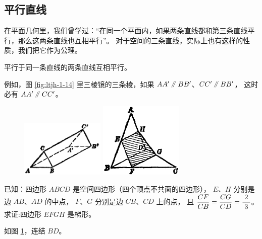\subsection{平行直线}\label{subsec:1-5}
\begin{enhancedline}

在平面几何里，我们曾学过：“在同一个平面内，如果两条直线都和第三条直线平行，那么这两条直线也互相平行”。
对于空间的三条直线，实际上也有这样的性质，我们把它作为公理。

\begin{gongli}[公理4][gl:zxpx]
    平行于同一条直线的两条直线互相平行。
\end{gongli}

例如，图 \ref{fig:ltjh-1-14} 里三棱镜的三条棱，如果 $AA' \pingxing BB'$、$CC' \pingxing BB'$，
这时必有 $AA' \pingxing CC'$。

\begin{figure}[htbp]
    \centering
    \begin{minipage}[b]{7cm}
        \centering
        \includegraphics[width=4cm]{../pic/ltjh-ch1-14.png}
        \caption{}\label{fig:ltjh-1-14}
    \end{minipage}
    \qquad
    \begin{minipage}[b]{7cm}
        \centering
        \includegraphics[width=4cm]{../pic/ltjh-ch1-15.png}
        \caption{}\label{fig:ltjh-1-15}
    \end{minipage}
\end{figure}

\liti[0] 已知：四边形 $ABCD$ 是空间四边形（四个顶点不共面的四边形），
$E$、$H$ 分别是边 $AB$、$AD$ 的中点， $F$、$G$ 分别是边 $CB$、$CD$ 上的点，
且 $\dfrac{CF}{CB} = \dfrac{CG}{CD} = \dfrac{\; 2 \;}{3}$。
求证:四边形 $EFGH$ 是梯形。

\zhengming 如图 \ref{fig:ltjh-1-15}，连结 $BD$。


\end{enhancedline}
